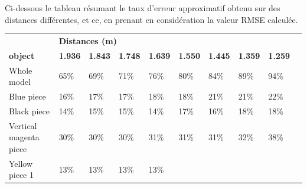 \documentclass[a4paper, 12pt]{book}
\begin{document}
\vspace{2cm}

Ci-dessous le tableau résumant le taux d'erreur approximatif obtenu sur des distances différentes, et ce, en  prenant en considération la valeur RMSE  calculée. \\


\begin{table}[H]
\centering
\setlength\tabcolsep{2pt}
\begin{tabular}{c|lllllllll}
\cline{1-9}
\multicolumn{1}{|l|}{}   & 
\multicolumn{8}{l|}{\textbf{\hspace{4.5cm} Distances (m)}}    \\
\cline{1-9}
\multicolumn{1}{|l|}{\textbf{object}}   & 
\multicolumn{1}{l|}{\textbf{1.936 }} & 
\multicolumn{1}{l|}{\textbf{1.843}} & 
\multicolumn{1}{l|}{\textbf{1.748}} &  
\multicolumn{1}{l|}{\textbf{1.639 }} & 
\multicolumn{1}{l|}{\textbf{1.550}} & 
\multicolumn{1}{l|}{\textbf{1.445}} & 
\multicolumn{1}{l|}{\textbf{1.359}} & 
\multicolumn{1}{l|}{\textbf{1.259}} & \\
\cline{1-9}
\multicolumn{1}{|l|}{Whole model}  & 
\multicolumn{1}{l|}{65\%}  &  
\multicolumn{1}{l|}{69\%}  & 
\multicolumn{1}{l|}{71\%}  & 
\multicolumn{1}{l|}{76\%}  & 
\multicolumn{1}{l|}{80\%}  & 
\multicolumn{1}{l|}{84\%}  & 
\multicolumn{1}{l|}{89\%}  & 
\multicolumn{1}{l|}{94\%}  &  \\ 
\cline{1-9}
\multicolumn{1}{|l|}{Blue piece}  &
\multicolumn{1}{l|}{16\%}  &
\multicolumn{1}{l|}{17\%}  & 
\multicolumn{1}{l|}{17\%} & 
\multicolumn{1}{l|}{18\%}  & 
\multicolumn{1}{l|}{18\%}  &  
\multicolumn{1}{l|}{21\%}  & 
\multicolumn{1}{l|}{21\%}  &
\multicolumn{1}{l|}{22\%}   &  \\ 
\cline{1-9}
\multicolumn{1}{|l|}{Black piece}  & 
\multicolumn{1}{l|}{14\%}  & 
\multicolumn{1}{l|}{15\%}  & 
\multicolumn{1}{l|}{15\%} & 
\multicolumn{1}{l|}{14\%}  & 
\multicolumn{1}{l|}{17\%}  &
\multicolumn{1}{l|}{16\%}  & 
\multicolumn{1}{l|}{18\%}  & 
\multicolumn{1}{l|}{18\%}  &  \\ 
\cline{1-9}
\multicolumn{1}{|l|}{Vertical magenta piece}  & 
\multicolumn{1}{l|}{30\%}  & 
\multicolumn{1}{l|}{30\%}  & 
\multicolumn{1}{l|}{30\%} & 
\multicolumn{1}{l|}{31\%}  & 
\multicolumn{1}{l|}{31\%}  & 
\multicolumn{1}{l|}{31\%}  & 
\multicolumn{1}{l|}{32\%}  &  
\multicolumn{1}{l|}{38\%}  & \\ 
\cline{1-9}
\multicolumn{1}{|l|}{Yellow piece 1}  & 
\multicolumn{1}{l|}{13\%}  & 
\multicolumn{1}{l|}{13\%}  & 
\multicolumn{1}{l|}{13\%}  & 
\multicolumn{1}{l|}{13\%}  & 

\end{tabular}
\end{table}
\end{document}
